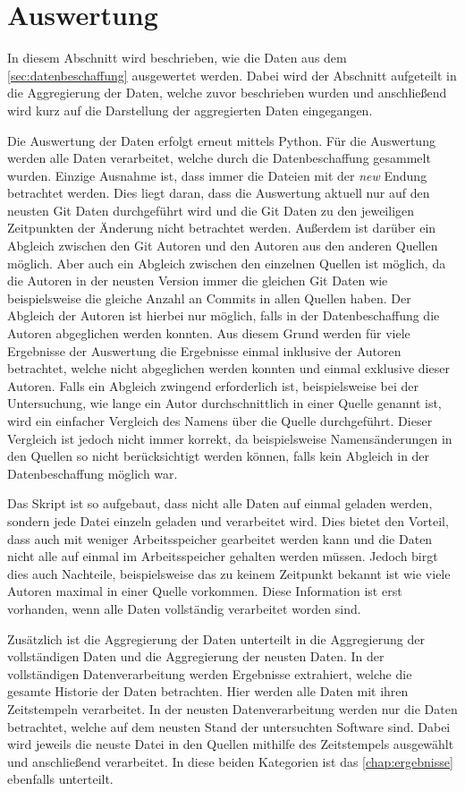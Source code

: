 \section{Auswertung}
\label{sec:auswertung}
In diesem Abschnitt wird beschrieben, wie die Daten aus dem \autoref{sec:datenbeschaffung} ausgewertet werden.
Dabei wird der Abschnitt aufgeteilt in die Aggregierung der Daten, welche zuvor beschrieben wurden und anschließend wird kurz auf die Darstellung der aggregierten Daten eingegangen.

Die Auswertung der Daten erfolgt erneut mittels Python.
Für die Auswertung werden alle Daten verarbeitet, welche durch die Datenbeschaffung gesammelt wurden.
Einzige Ausnahme ist, dass immer die Dateien mit der \emph{new} Endung betrachtet werden.
Dies liegt daran, dass die Auswertung aktuell nur auf den neusten Git Daten durchgeführt wird und die Git Daten zu den jeweiligen Zeitpunkten der Änderung nicht betrachtet werden.
Außerdem ist darüber ein Abgleich zwischen den Git Autoren und den Autoren aus den anderen Quellen möglich.
Aber auch ein Abgleich zwischen den einzelnen Quellen ist möglich, da die Autoren in der neusten Version immer die gleichen Git Daten wie beispielsweise die gleiche Anzahl an Commits in allen Quellen haben.
Der Abgleich der Autoren ist hierbei nur möglich, falls in der Datenbeschaffung die Autoren abgeglichen werden konnten.
Aus diesem Grund werden für viele Ergebnisse der Auswertung die Ergebnisse einmal inklusive der Autoren betrachtet, welche nicht abgeglichen werden konnten und einmal exklusive dieser Autoren.
Falls ein Abgleich zwingend erforderlich ist, beispielsweise bei der Untersuchung, wie lange ein Autor durchschnittlich in einer Quelle genannt ist, wird ein einfacher Vergleich des Namens über die Quelle durchgeführt.
Dieser Vergleich ist jedoch nicht immer korrekt, da beispielsweise Namensänderungen in den Quellen so nicht berücksichtigt werden können, falls kein Abgleich in der Datenbeschaffung möglich war.

Das Skript ist so aufgebaut, dass nicht alle Daten auf einmal geladen werden, sondern jede Datei einzeln geladen und verarbeitet wird.
Dies bietet den Vorteil, dass auch mit weniger Arbeitsspeicher gearbeitet werden kann und die Daten nicht alle auf einmal im Arbeitsspeicher gehalten werden müssen.
Jedoch birgt dies auch Nachteile, beispielsweise das zu keinem Zeitpunkt bekannt ist wie viele Autoren maximal in einer Quelle vorkommen.
Diese Information ist erst vorhanden, wenn alle Daten vollständig verarbeitet worden sind.

Zusätzlich ist die Aggregierung der Daten unterteilt in die Aggregierung der vollständigen Daten und die Aggregierung der neusten Daten.
In der vollständigen Datenverarbeitung werden Ergebnisse extrahiert, welche die gesamte Historie der Daten betrachten.
Hier werden alle Daten mit ihren Zeitstempeln verarbeitet.
In der neusten Datenverarbeitung werden nur die Daten betrachtet, welche auf dem neusten Stand der untersuchten Software sind.
Dabei wird jeweils die neuste Datei in den Quellen mithilfe des Zeitstempels ausgewählt und anschließend verarbeitet.
In diese beiden Kategorien ist das \autoref{chap:ergebnisse} ebenfalls unterteilt.
